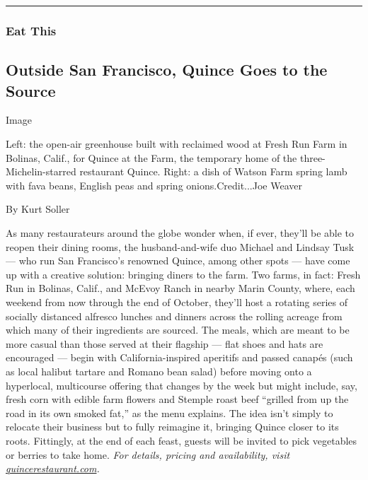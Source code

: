\begin{center}\rule{0.5\linewidth}{\linethickness}\end{center}

\hypertarget{eat-this}{%
\subsubsection{Eat This}\label{eat-this}}

\hypertarget{outside-san-francisco-quince-goes-to-the-source}{%
\subsection{Outside San Francisco, Quince Goes to the
Source}\label{outside-san-francisco-quince-goes-to-the-source}}

Image

Left: the open-air greenhouse built with reclaimed wood at Fresh Run
Farm in Bolinas, Calif., for Quince at the Farm, the temporary home of
the three-Michelin-starred restaurant Quince. Right: a dish of Watson
Farm spring lamb with fava beans, English peas and spring
onions.Credit...Joe Weaver

By Kurt Soller

As many restaurateurs around the globe wonder when, if ever, they'll be
able to reopen their dining rooms, the husband-and-wife duo Michael and
Lindsay Tusk --- who run San Francisco's renowned Quince, among other
spots --- have come up with a creative solution: bringing diners to the
farm. Two farms, in fact: Fresh Run in Bolinas, Calif., and McEvoy Ranch
in nearby Marin County, where, each weekend from now through the end of
October, they'll host a rotating series of socially distanced alfresco
lunches and dinners across the rolling acreage from which many of their
ingredients are sourced. The meals, which are meant to be more casual
than those served at their flagship --- flat shoes and hats are
encouraged --- begin with California-inspired aperitifs and passed
canapés (such as local halibut tartare and Romano bean salad) before
moving onto a hyperlocal, multicourse offering that changes by the week
but might include, say, fresh corn with edible farm flowers and Stemple
roast beef ``grilled from up the road in its own smoked fat,'' as the
menu explains. The idea isn't simply to relocate their business but to
fully reimagine it, bringing Quince closer to its roots. Fittingly, at
the end of each feast, guests will be invited to pick vegetables or
berries to take home. \emph{For details, pricing and availability,
visit}
\href{http://quincerestaurant.com/}{\emph{quincerestaurant.com}}\emph{.}

